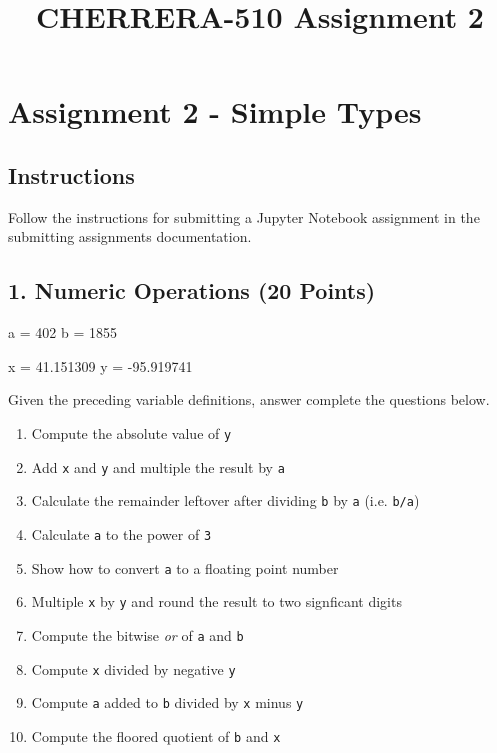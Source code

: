 \documentclass[11pt]{article}
\title{CHERRERA-510 Assignment 2}
\newenvironment{Shaded}{}{}
\newcommand{\DecValTok}[1]{\textcolor[rgb]{0.25,0.63,0.44}{{#1}}}
\newcommand{\FloatTok}[1]{\textcolor[rgb]{0.25,0.63,0.44}{{#1}}}
\newcommand{\NormalTok}[1]{{#1}}
\newcommand{\OperatorTok}[1]{\textcolor[rgb]{0.40,0.40,0.40}{{#1}}}
\begin{document}
    
    
    \maketitle
    
    

    
    \hypertarget{assignment-2---simple-types}{%
\section{Assignment 2 - Simple
Types}\label{assignment-2---simple-types}}

\hypertarget{instructions}{%
\subsection{Instructions}\label{instructions}}

Follow the instructions for submitting a Jupyter Notebook assignment in
the submitting assignments documentation.

    \hypertarget{numeric-operations-20-points}{%
\subsection{1. Numeric Operations (20
Points)}\label{numeric-operations-20-points}}

\begin{Shaded}
\begin{Highlighting}[]
\NormalTok{a }\OperatorTok{=} \DecValTok{402}
\NormalTok{b }\OperatorTok{=} \DecValTok{1855}

\NormalTok{x }\OperatorTok{=} \FloatTok{41.151309}
\NormalTok{y }\OperatorTok{=} \FloatTok{-95.919741}
\end{Highlighting}
\end{Shaded}

Given the preceding variable definitions, answer complete the questions
below.

\begin{enumerate}
\def\labelenumi{\alph{enumi}.}
\item
  Compute the absolute value of \texttt{y}
\item
  Add \texttt{x} and \texttt{y} and multiple the result by \texttt{a}
\item
  Calculate the remainder leftover after dividing \texttt{b} by
  \texttt{a} (i.e. \texttt{b/a})
\item
  Calculate \texttt{a} to the power of \texttt{3}
\item
  Show how to convert \texttt{a} to a floating point number
\item
  Multiple \texttt{x} by \texttt{y} and round the result to two
  signficant digits
\item
  Compute the bitwise \emph{or} of \texttt{a} and \texttt{b}
\item
  Compute \texttt{x} divided by negative \texttt{y}
\item
  Compute \texttt{a} added to \texttt{b} divided by \texttt{x} minus
  \texttt{y}
\item
  Compute the floored quotient of \texttt{b} and \texttt{x}
\end{enumerate}
\end{document}
